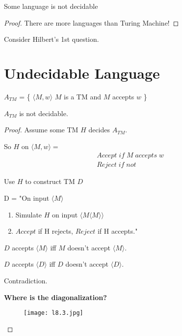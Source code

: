 \begin{corollary}
    Some language is not decidable 
\end{corollary}
\begin{proof}
    There are more languages than Turing Machine! 
\end{proof}

\begin{remark}
    Consider Hilbert's 1st question.
\end{remark}

\section{Undecidable Language}
\begin{theorem}
    \(A_{TM}\) = \{ \(\langle M, w \rangle\) \(M\) is a TM and \(M\) accepts \(w\)  \} 

    \(A_{TM}\) is not decidable. 
\end{theorem}
\begin{proof}
    Assume some TM \(H\) decides \(A_{TM}\).  

    So \(H\) on \(\langle M, w \rangle = \) \begin{align*}
        & Accept \; if \; M \;accepts \;w\\
        & Reject \; if \; not
    \end{align*} 

    Use \(H\) to construct TM \(D\)  

    D = "On input \(\langle M \rangle \)
        \begin{enumerate}
            \item Simulate \(H\) on input \(\langle M \langle M \rangle \rangle \)
            \item \(Accept\) if H rejects, \(Reject\) if H accepts."    
        \end{enumerate} 

    \(D\) accepts \(\langle M \rangle \) iff \(M\) doesn't accept \(\langle M \rangle\).    

    \(D\) accepts \(\langle D \rangle \) iff \(D\) doesn't accept \(\langle D \rangle\).    

    Contradiction.
    \hfill\break

    \textbf{Where is the diagonalization?}
    \begin{figure}[H]
    \centering
    \texttt{[image: l8.3.jpg]}
    \caption{}
    \end{figure}
\end{proof}

